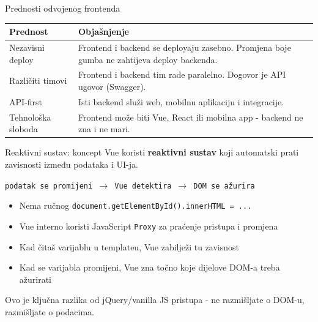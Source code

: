 \begin{frame}{Prednosti odvojenog frontenda}
\begin{tabular}{@{}lp{10cm}@{}}
  \toprule
  \textbf{Prednost} & \textbf{Objašnjenje} \\
  \midrule
  Nezavisni deploy & Frontend i backend se deployaju zasebno. Promjena boje gumba ne zahtijeva deploy backenda. \\
  Različiti timovi & Frontend i backend tim rade paralelno. Dogovor je API ugovor (Swagger). \\
  API-first & Isti backend služi web, mobilnu aplikaciju i integracije. \\
  Tehnološka sloboda & Frontend može biti Vue, React ili mobilna app - backend ne zna i ne mari. \\
  \bottomrule
\end{tabular}
\end{frame}

\begin{frame}{Reaktivni sustav: koncept}
Vue koristi \textbf{reaktivni sustav} koji automatski prati zavisnosti između podataka i UI-ja.

\vspace{0.6em}
\begin{center}
\texttt{podatak se promijeni $\rightarrow$ Vue detektira $\rightarrow$ DOM se ažurira}
\end{center}

\vspace{0.6em}
\begin{itemize}
  \item Nema ručnog \texttt{document.getElementById().innerHTML = ...}
  \item Vue interno koristi JavaScript \texttt{Proxy} za praćenje pristupa i promjena
  \item Kad čitaš varijablu u templateu, Vue zabilježi tu zavisnost
  \item Kad se varijabla promijeni, Vue zna točno koje dijelove DOM-a treba ažurirati
\end{itemize}

\vspace{0.4em}
Ovo je ključna razlika od jQuery/vanilla JS pristupa - ne razmišljate o DOM-u, razmišljate o podacima.
\end{frame}

